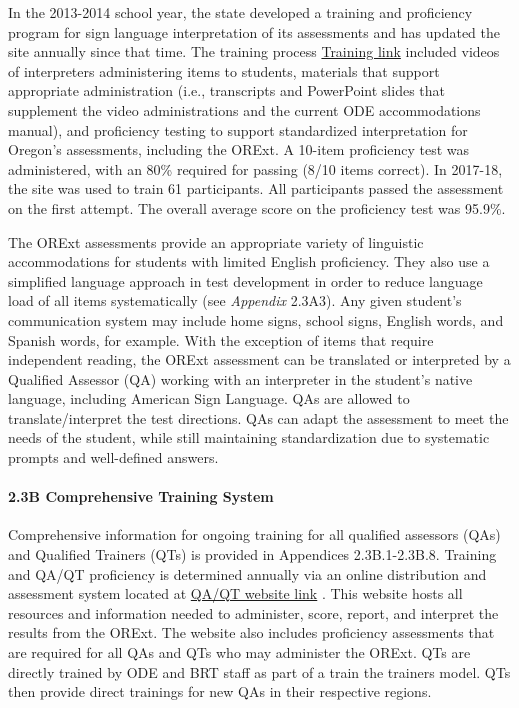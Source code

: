 \documentclass[]{article}
\let\oldparagraph\paragraph
\renewcommand{\paragraph}[1]{\oldparagraph{#1}\mbox{}}
\begin{document}
In the 2013-2014 school year, the state developed a training and
proficiency program for sign language interpretation of its assessments
and has updated the site annually since that time. The training process
\color{link}\href{http://lms.brtprojects.org}{Training link}
\color{black} included videos of interpreters administering items to
students, materials that support appropriate administration (i.e.,
transcripts and PowerPoint slides that supplement the video
administrations and the current ODE accommodations manual), and
proficiency testing to support standardized interpretation for Oregon's
assessments, including the ORExt. A 10-item proficiency test was
administered, with an 80\% required for passing (8/10 items correct). In
2017-18, the site was used to train 61 participants. All participants
passed the assessment on the first attempt. The overall average score on
the proficiency test was 95.9\%.

The ORExt assessments provide an appropriate variety of linguistic
accommodations for students with limited English proficiency. They also
use a simplified language approach in test development in order to
reduce language load of all items systematically (see \emph{Appendix}
2.3A3). Any given student's communication system may include home signs,
school signs, English words, and Spanish words, for example. With the
exception of items that require independent reading, the ORExt
assessment can be translated or interpreted by a Qualified Assessor (QA)
working with an interpreter in the student's native language, including
American Sign Language. QAs are allowed to translate/interpret the test
directions. QAs can adapt the assessment to meet the needs of the
student, while still maintaining standardization due to systematic
prompts and well-defined answers.

\paragraph{2.3B Comprehensive Training
System}\label{b-comprehensive-training-system}

Comprehensive information for ongoing training for all qualified
assessors (QAs) and Qualified Trainers (QTs) is provided in Appendices
2.3B.1-2.3B.8. Training and QA/QT proficiency is determined annually via
an online distribution and assessment system located at \color{link}
\href{https://or.k12test.com/}{QA/QT website link} \color{black}. This
website hosts all resources and information needed to administer, score,
report, and interpret the results from the ORExt. The website also
includes proficiency assessments that are required for all QAs and QTs
who may administer the ORExt. QTs are directly trained by ODE and BRT
staff as part of a train the trainers model. QTs then provide direct
trainings for new QAs in their respective regions.
\end{document}
